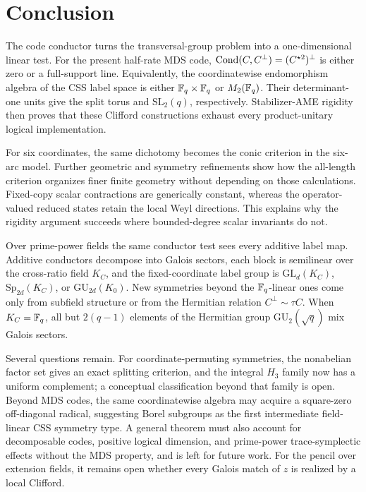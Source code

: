\section{Conclusion}

The code conductor turns the transversal-group problem into a
one-dimensional linear test.  For the present half-rate MDS code,
\(\operatorname{Cond}(C,C^\perp)=(C^{\star2})^\perp\) is either zero or a full-support line.
Equivalently, the coordinatewise endomorphism algebra of the CSS label space
is either \(\mathbb F_q\times\mathbb F_q\) or \(M_2(\mathbb F_q)\).  Their determinant-one units
give the split torus and \(\mathrm{SL}_2(q)\), respectively.  Stabilizer-AME
rigidity then proves that these Clifford constructions exhaust every
product-unitary logical implementation.

For six coordinates, the same dichotomy becomes the conic criterion in the
six-arc model.  Further geometric and symmetry refinements show how the
all-length criterion organizes finer finite geometry without depending on
those calculations.  Fixed-copy scalar
contractions are generically constant, whereas the operator-valued reduced
states retain the local Weyl directions.  This explains why the rigidity
argument succeeds where bounded-degree scalar invariants do not.

Over prime-power fields the same conductor test sees every additive label
map.  Additive conductors decompose into Galois sectors, each block is
semilinear over the cross-ratio field \(K_C\), and the fixed-coordinate
label group is \(\mathrm{GL}_d(K_C)\), \(\mathrm{Sp}_{2d}(K_C)\), or
\(\mathrm{GU}_{2d}(K_0)\).  New symmetries beyond the \(\mathbb F_q\)-linear ones
come only from subfield structure or from the Hermitian relation
\(C^\perp\sim\tau C\).  When \(K_C=\mathbb F_q\), all but \(2(q-1)\) elements of
the Hermitian group \(\mathrm{GU}_2(\sqrt q)\) mix Galois sectors.

Several questions remain.  For coordinate-permuting symmetries, the nonabelian factor set gives an
exact splitting criterion, and the integral \(H_3\) family now has a uniform
complement; a conceptual classification beyond that family is open.  Beyond
MDS codes, the same coordinatewise algebra may
acquire a square-zero off-diagonal radical, suggesting Borel subgroups as the
first intermediate field-linear CSS symmetry type.  A general theorem must
also account for decomposable codes, positive logical dimension, and
prime-power trace-symplectic effects without the MDS property, and is left
for future work.  For the pencil over extension fields, it remains open
whether every Galois match of \(z\) is realized by a local Clifford.
